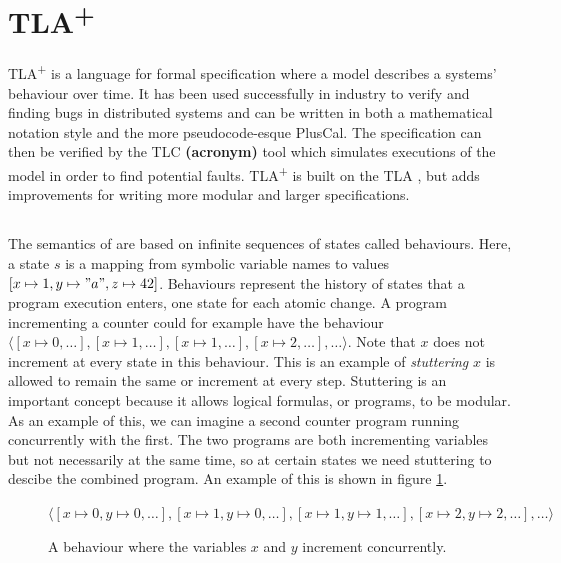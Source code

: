\documentclass[english, biblatex, digitaloutput]{kththesis}
\begin{document}

\section{TLA\textsuperscript+}

TLA\textsuperscript+ \cite{lamport_specifying_2001} is a language for formal specification where a model describes a systems' behaviour over time. It has been used successfully in industry to verify and finding bugs in distributed systems \cite{joshi_checking_2003,newcombe_how_2015} and can be written in both a mathematical notation style and the more pseudocode-esque PlusCal. The specification can then be verified by the TLC \textbf{(acronym)} tool which simulates executions of the model in order to find potential faults. TLA\textsuperscript+ is built on the \gls{TLA} \cite{lamport_temporal_1994}, but adds improvements for writing more modular and larger specifications.

\subsection{}

The semantics of  are based on infinite sequences of states called behaviours. Here, a state $s$ is a mapping from symbolic variable names to values \eg $[x \mapsto 1, y \mapsto "a", z \mapsto 42]$. Behaviours represent the history of states that a program execution enters, one state for each atomic change. A program incrementing a counter could for example have the behaviour $\langle [x \mapsto 0, \dotsc], [x \mapsto 1, \dotsc], [x \mapsto 1, \dotsc], [x \mapsto 2, \dotsc], \dotsc \rangle$. Note that $x$ does not increment at every state in this behaviour. This is an example of \textit{stuttering} \ie $x$ is allowed to remain the same or increment at every step. Stuttering is an important concept because it allows logical formulas, or programs, to be modular. As an example of this, we can imagine a second counter program running concurrently with the first. The two programs are both incrementing variables but not necessarily at the same time, so at certain states we need stuttering to descibe the combined program. An example of this is shown in figure \ref{fig:concurrent-behaviour}.

\begin{figure}
	$\langle [x \mapsto 0, y \mapsto 0, \dotsc], [x \mapsto 1, y \mapsto 0, \dotsc], [x \mapsto 1, y \mapsto 1, \dotsc], [x \mapsto 2, y \mapsto 2, \dotsc], \dotsc \rangle$
	\caption{A behaviour where the variables $x$ and $y$ increment concurrently.}
	\label{fig:concurrent-behaviour}
\end{figure}
\end{document}
